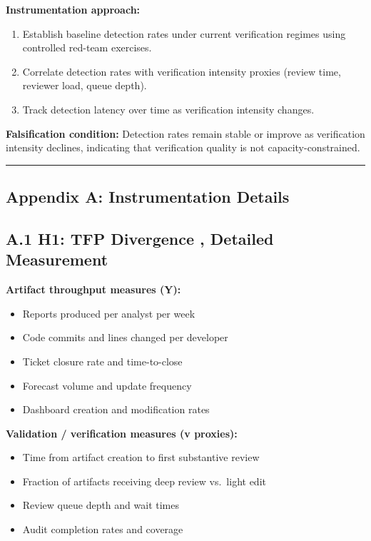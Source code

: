 \documentclass[11pt,a4paper]{article}
\providecommand{\tightlist}{\setlength{\itemsep}{0pt}\setlength{\parskip}{0pt}}
\begin{document}
\textbf{Instrumentation approach:}

\begin{enumerate}
\def\labelenumi{\arabic{enumi}.}
\tightlist
\item
  Establish baseline detection rates under current verification regimes using controlled red-team exercises.
\item
  Correlate detection rates with verification intensity proxies (review time, reviewer load, queue depth).
\item
  Track detection latency over time as verification intensity changes.
\end{enumerate}

\textbf{Falsification condition:} Detection rates remain stable or improve as verification intensity declines, indicating that verification quality is not capacity-constrained.

\begin{center}\rule{0.5\linewidth}{0.5pt}\end{center}

\hypertarget{appendix-a-instrumentation-details}{%
\subsection{Appendix A: Instrumentation Details}\label{appendix-a-instrumentation-details}}

\hypertarget{a.1-h1-tfp-divergence-detailed-measurement}{%
\subsection{A.1 H1: TFP Divergence ,  Detailed Measurement}\label{a.1-h1-tfp-divergence-detailed-measurement}}

\textbf{Artifact throughput measures (Y):}

\begin{itemize}
\tightlist
\item
  Reports produced per analyst per week
\item
  Code commits and lines changed per developer
\item
  Ticket closure rate and time-to-close
\item
  Forecast volume and update frequency
\item
  Dashboard creation and modification rates
\end{itemize}

\textbf{Validation / verification measures (v proxies):}

\begin{itemize}
\tightlist
\item
  Time from artifact creation to first substantive review
\item
  Fraction of artifacts receiving deep review vs.~light edit
\item
  Review queue depth and wait times
\item
  Audit completion rates and coverage
\end{itemize}
\end{document}
